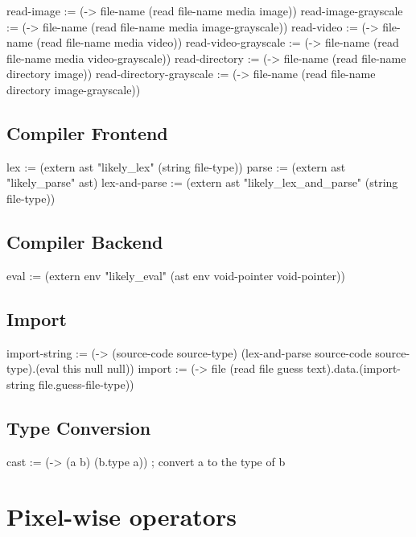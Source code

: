 \documentclass[numbers=noenddot]{scrbook}
\newenvironment{likely}
{ \verbatim }
{ \endverbatim }
\begin{document}
\begin{likely}
read-image               := (-> file-name (read file-name media image))
read-image-grayscale     := (-> file-name (read file-name media image-grayscale))
read-video               := (-> file-name (read file-name media video))
read-video-grayscale     := (-> file-name (read file-name media video-grayscale))
read-directory           := (-> file-name (read file-name directory image))
read-directory-grayscale := (-> file-name (read file-name directory image-grayscale))
\end{likely}

\section{Compiler Frontend}
\begin{likely}
lex := (extern ast "likely_lex" (string file-type))
parse := (extern ast "likely_parse" ast)
lex-and-parse := (extern ast "likely_lex_and_parse" (string file-type))
\end{likely}

\section{Compiler Backend}
\begin{likely}
eval := (extern env "likely_eval" (ast env void-pointer void-pointer))
\end{likely}

\section{Import}
\begin{likely}
import-string := (-> (source-code source-type) (lex-and-parse source-code source-type).(eval this null null))
import := (-> file (read file guess text).data.(import-string file.guess-file-type))
\end{likely}

\section{Type Conversion}
\begin{likely}
cast := (-> (a b) (b.type a)) ; convert a to the type of b
\end{likely}

\chapter{Pixel-wise operators}
\end{document}
